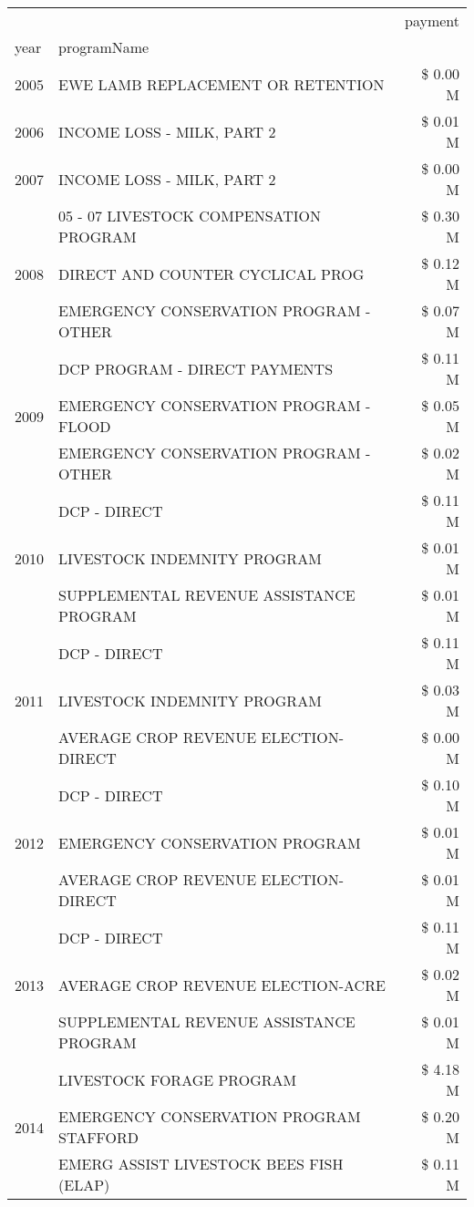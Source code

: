 \begin{tabular}{llr}
\toprule
 &  & payment \\
year & programName &  \\
\midrule
2005 & EWE LAMB REPLACEMENT OR RETENTION & \$ 0.00 M \\
\cline{1-3}
2006 & INCOME LOSS - MILK, PART 2 & \$ 0.01 M \\
\cline{1-3}
2007 & INCOME LOSS - MILK, PART 2 & \$ 0.00 M \\
\cline{1-3}
\multirow[t]{3}{*}{2008} & 05 - 07 LIVESTOCK COMPENSATION PROGRAM & \$ 0.30 M \\
 & DIRECT AND COUNTER CYCLICAL PROG & \$ 0.12 M \\
 & EMERGENCY CONSERVATION PROGRAM - OTHER & \$ 0.07 M \\
\cline{1-3}
\multirow[t]{3}{*}{2009} & DCP PROGRAM - DIRECT PAYMENTS & \$ 0.11 M \\
 & EMERGENCY CONSERVATION PROGRAM - FLOOD & \$ 0.05 M \\
 & EMERGENCY CONSERVATION PROGRAM - OTHER & \$ 0.02 M \\
\cline{1-3}
\multirow[t]{3}{*}{2010} & DCP - DIRECT & \$ 0.11 M \\
 & LIVESTOCK INDEMNITY PROGRAM & \$ 0.01 M \\
 & SUPPLEMENTAL REVENUE ASSISTANCE PROGRAM & \$ 0.01 M \\
\cline{1-3}
\multirow[t]{3}{*}{2011} & DCP - DIRECT & \$ 0.11 M \\
 & LIVESTOCK INDEMNITY PROGRAM & \$ 0.03 M \\
 & AVERAGE CROP REVENUE ELECTION-DIRECT & \$ 0.00 M \\
\cline{1-3}
\multirow[t]{3}{*}{2012} & DCP - DIRECT & \$ 0.10 M \\
 & EMERGENCY CONSERVATION PROGRAM & \$ 0.01 M \\
 & AVERAGE CROP REVENUE ELECTION-DIRECT & \$ 0.01 M \\
\cline{1-3}
\multirow[t]{3}{*}{2013} & DCP - DIRECT & \$ 0.11 M \\
 & AVERAGE CROP REVENUE ELECTION-ACRE & \$ 0.02 M \\
 & SUPPLEMENTAL REVENUE ASSISTANCE PROGRAM & \$ 0.01 M \\
\cline{1-3}
\multirow[t]{3}{*}{2014} & LIVESTOCK FORAGE PROGRAM & \$ 4.18 M \\
 & EMERGENCY CONSERVATION PROGRAM STAFFORD & \$ 0.20 M \\
 & EMERG ASSIST LIVESTOCK BEES FISH (ELAP) & \$ 0.11 M \\

\end{tabular}
